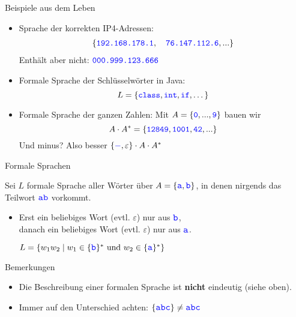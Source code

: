 \begin{frame}{Beispiele aus dem Leben}
	\begin{itemize}
		\item Sprache der korrekten IP4-Adressen: \pause
		\begin{align*}
		\left\{\hbox{\textcolor{blue}{\texttt{192.168.178.1}}}, \quad 
			\hbox{\textcolor{blue}{\texttt{76.147.112.6}}}, ... \right\}
		\end{align*} 
		\pause Enthält aber nicht: $\hbox{\textcolor{blue}{\texttt{000.999.123.666}}}$ \pause
		\item Formale Sprache der Schlüsselwörter in Java: $$L = \{ \hbox{\textcolor{blue}{\texttt{class}}}, \hbox{\textcolor{blue}{\texttt{int}}} , \hbox{\textcolor{blue}{\texttt{if}}}, \dots \}$$ \pause
		\item Formale Sprache der ganzen Zahlen: Mit $A = \{\hbox{\textcolor{blue}{\texttt{0}}}, ..., \hbox{\textcolor{blue}{\texttt{9}}}\}$ bauen wir
		\pause $$A \cdot A^* = \{\hbox{\textcolor{blue}{\texttt{12849}}}, \hbox{\textcolor{blue}{\texttt{1001}}}, \hbox{\textcolor{blue}{\texttt{42}}}, ...\}$$ 
		\pause Und minus? Also besser $ \{ \hbox{\textcolor{blue}{$\mathtt{-}$}}, \varepsilon \} \cdot A \cdot A^*$
	\end{itemize}
\end{frame}

\begin{frame}{Formale Sprachen}
	
	\begin{Beispiel}
		Sei $L$ formale Sprache aller Wörter über $A=\{\literal{a},\literal{b}\}$, in denen nirgends das Teilwort $\literal{ab}$ vorkommt.
		\begin{itemize}
			\pause
			\implitem $L=\{\literal{a},\literal{b}\}^*
			\setminus \set{w_1 \cdot \literal{ab} \cdot w_2 \mid w_1,w_2\in
			\{\literal{a},\literal{b}\}^* }$
			
			\pause
			\item Erst ein beliebiges Wort (evtl. $\varepsilon$) nur aus $\literal{b}$,\\
			danach ein beliebiges Wort (evtl. $\varepsilon$) nur aus $\literal{a}$.
			
			\pause
			\implitem $L=\set{w_1w_2 \mid w_1\in 
			\{\literal{b}\}^*  \text{ und }  w_2\in \{\literal{a}\}^* }$
		\end{itemize}
	\end{Beispiel}
	
	\begin{block}{Bemerkungen}
		\begin{itemize}
			\pause
			\item Die Beschreibung einer formalen Sprache ist \textbf{nicht} eindeutig (siehe oben).
			\pause
			\item Immer auf den Unterschied achten: $\{\literal{abc} \} \neq \literal{abc} $
		\end{itemize}
	\end{block}
\end{frame}


